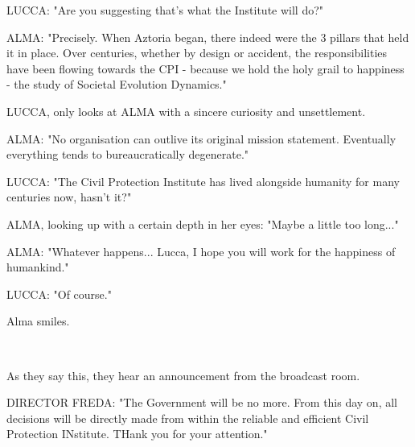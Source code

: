 \documentclass[11pt]{article}
\begin{document}
LUCCA: "Are you suggesting that's what the Institute will do?"

ALMA: "Precisely.
When Aztoria began, there indeed were the 3 pillars that held it in place. 
Over centuries, whether by design or accident, the responsibilities have been flowing towards the CPI - because we hold the holy grail to happiness - the study of Societal Evolution Dynamics."

LUCCA, only looks at ALMA with a sincere curiosity and unsettlement.

ALMA: "No organisation can outlive its original mission statement. Eventually everything tends to bureaucratically degenerate."

LUCCA: "The Civil Protection Institute has lived alongside humanity for many centuries now, hasn't it?"

ALMA, looking up with a certain depth in her eyes: "Maybe a little too long..."

ALMA: "Whatever happens...
Lucca, I hope you will work for the happiness of humankind."

LUCCA: "Of course."

Alma smiles.

\ 

As they say this, they hear an announcement from the broadcast room.

DIRECTOR FREDA: "The Government will be no more. 
From this day on, all decisions will be directly made from within the reliable and efficient Civil Protection INstitute.
THank you for your attention."
\end{document}
